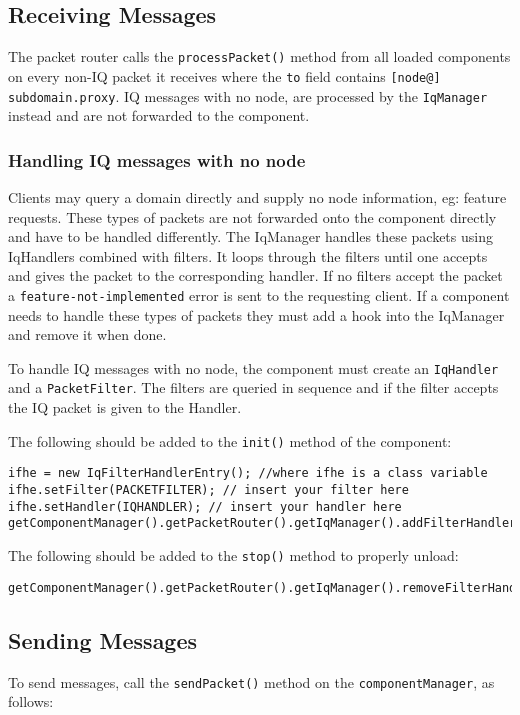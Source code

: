 \documentclass{article}
\newcommand{\code}[1]{\texttt{#1}}
\begin{document}
\subsection{Receiving Messages}
The packet router calls the \code{processPacket()} method from all loaded
components on every non-IQ packet it receives where the \code{to} field
contains \code{[node@] subdomain.proxy}.  IQ messages with no node, are
processed by the \code{IqManager} instead and are not forwarded to the
component.

\subsubsection{Handling IQ messages with no node}
Clients may query a domain directly and supply no node information, eg: feature requests. These types of packets are not forwarded onto the component directly and have to be handled differently. The IqManager handles these packets using IqHandlers combined with filters. It loops through the filters until one accepts and gives the packet to the corresponding handler. If no filters accept the packet a \code{feature-not-implemented} error is sent to the requesting client. If a component needs to handle these types of packets they must add a hook into the IqManager and remove it when done.

To handle IQ messages with no node, the component must create an
\code{IqHandler} and a \code{PacketFilter}. The filters are queried in sequence
and if the filter accepts the IQ packet is given to the Handler.

The following should be added to the \code{init()} method of the component:
\begin{verbatim}
ifhe = new IqFilterHandlerEntry(); //where ifhe is a class variable
ifhe.setFilter(PACKETFILTER); // insert your filter here
ifhe.setHandler(IQHANDLER); // insert your handler here
getComponentManager().getPacketRouter().getIqManager().addFilterHandler(ifhe);
\end{verbatim}

The following should be added to the \code{stop()} method to properly unload:

\begin{verbatim}
getComponentManager().getPacketRouter().getIqManager().removeFilterHandler(ifhe);
\end{verbatim}

\subsection{Sending Messages}
To send messages, call the \code{sendPacket()} method on the
\code{componentManager}, as follows:
\end{document}
